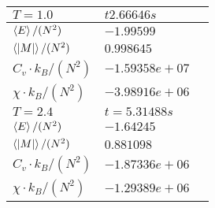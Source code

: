 \documentclass[10pt, twocolumn]{revtex4-1}
\begin{document}
\begin{table}[h]
    \begin{tabular}{ |l|l|l| }
        \hline
          $T = 1.0$ & $t 2.66646s$\\
        \hline
          $\ev{ E } / (N^2)$ & $-1.99599$\\
          $\ev{|M|} / (N^2)$ & $0.998645$\\
          $C_v\cdot k_B / (N^2)$ & $-1.59358e+07$\\
          $\chi \cdot k_B / (N^2)$ & $-3.98916e+06$\\
          \hline
        $T = 2.4$ & $t=5.31488s$\\
        \hline
          $\ev{ E } / (N^2)$ & $-1.64245$\\
          $\ev{|M|} / (N^2)$ & $0.881098$\\
          $C_v\cdot k_B / (N^2)$ & $-1.87336e+06$\\
          $\chi \cdot k_B / (N^2)$ & $-1.29389e+06$\\
          \hline
    \end{tabular}
\end{table}
\end{document}
